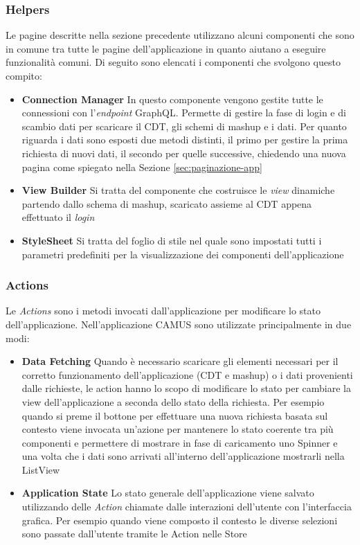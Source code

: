 \subsubsection{Helpers}

Le pagine descritte nella sezione precedente utilizzano alcuni componenti che sono in comune tra tutte le pagine dell'applicazione in quanto aiutano a eseguire funzionalità comuni. Di seguito sono elencati i componenti che svolgono questo compito:

\begin{itemize}
	\item \textbf{Connection Manager}
	In questo componente vengono gestite tutte le connessioni con l'\emph{endpoint} GraphQL. Permette di gestire la fase di login e di scambio dati per scaricare il CDT, gli schemi di mashup e i dati. Per quanto riguarda i dati sono esposti due metodi distinti, il primo per gestire la prima richiesta di nuovi dati, il secondo per quelle successive, chiedendo una nuova pagina come spiegato nella Sezione \ref{sec:paginazione-app}
	\item \textbf{View Builder}
	Si tratta del componente che costruisce le \emph{view} dinamiche partendo dallo schema di mashup, scaricato assieme al CDT appena effettuato il \emph{login}	
	\item \textbf{StyleSheet}
	Si tratta del foglio di stile nel quale sono impostati tutti i parametri predefiniti per la visualizzazione dei componenti dell'applicazione
\end{itemize}

\subsubsection{Actions\label{sec:actions}}

Le \emph{Actions} sono i metodi invocati dall'ap\-pli\-ca\-zio\-ne per modificare lo stato dell'ap\-pli\-ca\-zio\-ne. Nell'applicazione CAMUS sono utilizzate principalmente in due modi:

\begin{itemize}
	\item \textbf{Data Fetching}
	Quando è necessario scaricare gli elementi necessari per il corretto funzionamento dell'applicazione (CDT e mashup) o i dati provenienti dalle richieste, le action hanno lo scopo di modificare lo stato per cambiare la view dell'applicazione a seconda dello stato della richiesta.
	Per esempio quando si preme il bottone per effettuare una nuova richiesta basata sul contesto viene invocata un'azione per mantenere lo stato coerente tra più componenti e permettere di mostrare in fase di caricamento uno Spinner e una volta che i dati sono arrivati all'interno dell'applicazione mostrarli nella ListView
	\item \textbf{Application State}
	Lo stato generale dell'applicazione viene salvato utilizzando delle \emph{Action} chiamate dalle interazioni dell'utente con l'interfaccia grafica. Per esempio quando viene composto il contesto le diverse selezioni sono passate dall'utente tramite le Action nelle Store
\end{itemize}	

